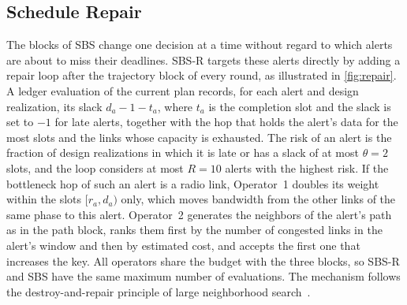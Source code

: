\subsection{Schedule Repair}
\label{sec:repair}
The blocks of SBS change one decision at a time without regard to which alerts are about to miss their deadlines. SBS-R targets these alerts directly by adding a repair loop after the trajectory block of every round, as illustrated in \cref{fig:repair}. A ledger evaluation of the current plan records, for each alert and design realization, its slack $d_a-1-t_a$, where $t_a$ is the completion slot and the slack is set to $-1$ for late alerts, together with the hop that holds the alert's data for the most slots and the links whose capacity is exhausted. The risk of an alert is the fraction of design realizations in which it is late or has a slack of at most $\theta=2$ slots, and the loop considers at most $R=10$ alerts with the highest risk. If the bottleneck hop of such an alert is a radio link, Operator~1 doubles its weight within the slots $[r_a,d_a)$ only, which moves bandwidth from the other links of the same phase to this alert. Operator~2 generates the neighbors of the alert's path as in the path block, ranks them first by the number of congested links in the alert's window and then by estimated cost, and accepts the first one that increases the key. All operators share the budget with the three blocks, so SBS-R and SBS have the same maximum number of evaluations. The mechanism follows the destroy-and-repair principle of large neighborhood search~\cite{ropke2006alns}.

